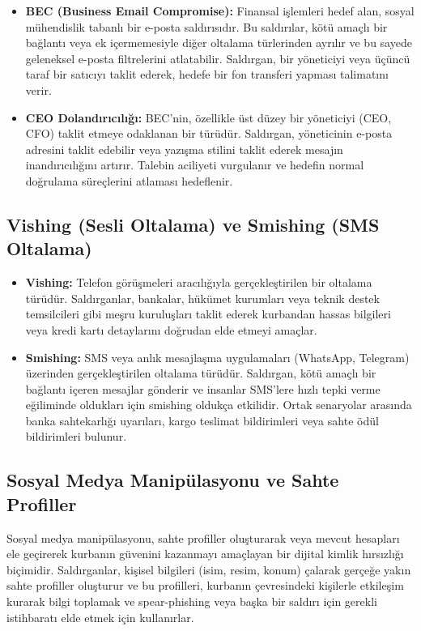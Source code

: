 \begin{itemize}
    \item \textbf{BEC (Business Email Compromise):} Finansal işlemleri hedef alan, sosyal mühendislik tabanlı bir e-posta saldırısıdır. Bu saldırılar, kötü amaçlı bir bağlantı veya ek içermemesiyle diğer oltalama türlerinden ayrılır ve bu sayede geleneksel e-posta filtrelerini atlatabilir. Saldırgan, bir yöneticiyi veya üçüncü taraf bir satıcıyı taklit ederek, hedefe bir fon transferi yapması talimatını verir.
    \item \textbf{CEO Dolandırıcılığı:} BEC'nin, özellikle üst düzey bir yöneticiyi (CEO, CFO) taklit etmeye odaklanan bir türüdür. Saldırgan, yöneticinin e-posta adresini taklit edebilir veya yazışma stilini taklit ederek mesajın inandırıcılığını artırır. Talebin aciliyeti vurgulanır ve hedefin normal doğrulama süreçlerini atlaması hedeflenir.
\end{itemize}

\subsection{Vishing (Sesli Oltalama) ve Smishing (SMS Oltalama)}

\begin{itemize}
    \item \textbf{Vishing:} Telefon görüşmeleri aracılığıyla gerçekleştirilen bir oltalama türüdür. Saldırganlar, bankalar, hükümet kurumları veya teknik destek temsilcileri gibi meşru kuruluşları taklit ederek kurbandan hassas bilgileri veya kredi kartı detaylarını doğrudan elde etmeyi amaçlar.
    \item \textbf{Smishing:} SMS veya anlık mesajlaşma uygulamaları (WhatsApp, Telegram) üzerinden gerçekleştirilen oltalama türüdür. Saldırgan, kötü amaçlı bir bağlantı içeren mesajlar gönderir ve insanlar SMS'lere hızlı tepki verme eğiliminde oldukları için smishing oldukça etkilidir. Ortak senaryolar arasında banka sahtekarlığı uyarıları, kargo teslimat bildirimleri veya sahte ödül bildirimleri bulunur.
\end{itemize}

\subsection{Sosyal Medya Manipülasyonu ve Sahte Profiller}

Sosyal medya manipülasyonu, sahte profiller oluşturarak veya mevcut hesapları ele geçirerek kurbanın güvenini kazanmayı amaçlayan bir dijital kimlik hırsızlığı biçimidir. Saldırganlar, kişisel bilgileri (isim, resim, konum) çalarak gerçeğe yakın sahte profiller oluşturur ve bu profilleri, kurbanın çevresindeki kişilerle etkileşim kurarak bilgi toplamak ve spear-phishing veya başka bir saldırı için gerekli istihbaratı elde etmek için kullanırlar.

